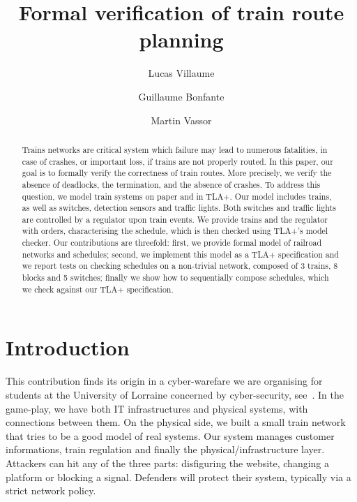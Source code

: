 \documentclass[runningheads]{llncs}
\begin{document}
%
\title{Formal verification of train route planning}
%
%
\author{Lucas Villaume \and Guillaume Bonfante \and Martin Vassor}
%
%
%
\maketitle
%
\begin{abstract}
	Trains networks are critical system which failure may lead to numerous fatalities, in case of crashes, or important loss, if trains are not properly routed. 
	In this paper, our goal is to formally verify the correctness of train routes. More precisely, we verify the absence of deadlocks, the termination, and the absence of crashes.
	To address this question, we model train systems on paper and in TLA+. Our model includes trains, as well as switches, detection sensors and traffic lights. Both switches and traffic lights are controlled by a regulator upon train events. We provide trains and the regulator with orders, characterising the schedule, which is then checked using TLA+'s model checker.
	Our contributions are threefold: first, we provide formal model of railroad networks and schedules; second, we implement this model as a TLA+ specification and we report tests on checking schedules on a non-trivial network, composed of 3 trains, 8 blocks and 5 switches; finally we show how to sequentially compose schedules, which we check against our TLA+ specification.

\end{abstract}


\section{Introduction}
\label{sec:introduction}

This contribution finds its origin in a cyber-warefare we are organising for students at the University of Lorraine concerned by cyber-security, see~\cite{CHE}. In the game-play, we have both IT infrastructures and physical systems, with connections between them. On the physical side, we built a small train network that tries to be a good model of real systems.  Our system manages customer informations, train regulation and finally the physical/infrastructure layer. Attackers can hit any of the three parts: disfiguring the website, changing a platform or blocking a signal. Defenders will protect their system, typically via a strict network policy.
\end{document}
